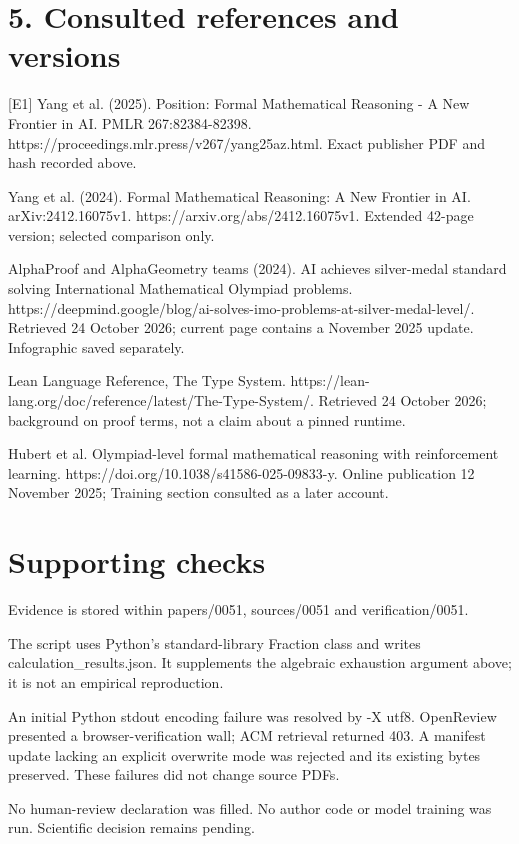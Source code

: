 \documentclass[10pt]{article}
\begin{document}
\section*{5. Consulted references and versions}
[E1] Yang et al. (2025). Position: Formal Mathematical Reasoning - A New Frontier in AI. PMLR 267:82384-82398. https://proceedings.mlr.press/v267/yang25az.html. Exact publisher PDF and hash recorded above.\par
Yang et al. (2024). Formal Mathematical Reasoning: A New Frontier in AI. arXiv:2412.16075v1. https://arxiv.org/abs/2412.16075v1. Extended 42-page version; selected comparison only.\par
AlphaProof and AlphaGeometry teams (2024). AI achieves silver-medal standard solving International Mathematical Olympiad problems. https://deepmind.google/blog/ai-solves-imo-problems-at-silver-medal-level/. Retrieved 24 October 2026; current page contains a November 2025 update. Infographic saved separately.\par
Lean Language Reference, The Type System. https://lean-lang.org/doc/reference/latest/The-Type-System/. Retrieved 24 October 2026; background on proof terms, not a claim about a pinned runtime.\par
Hubert et al. Olympiad-level formal mathematical reasoning with reinforcement learning. https://doi.org/10.1038/s41586-025-09833-y. Online publication 12 November 2025; Training section consulted as a later account.\par
\section*{Supporting checks}
Evidence is stored within papers/0051, sources/0051 and verification/0051.\par
The script uses Python’s standard-library Fraction class and writes calculation\_results.json. It supplements the algebraic exhaustion argument above; it is not an empirical reproduction.\par
An initial Python stdout encoding failure was resolved by -X utf8. OpenReview presented a browser-verification wall; ACM retrieval returned 403. A manifest update lacking an explicit overwrite mode was rejected and its existing bytes preserved. These failures did not change source PDFs.\par
No human-review declaration was filled. No author code or model training was run. Scientific decision remains pending.\par
\end{document}
